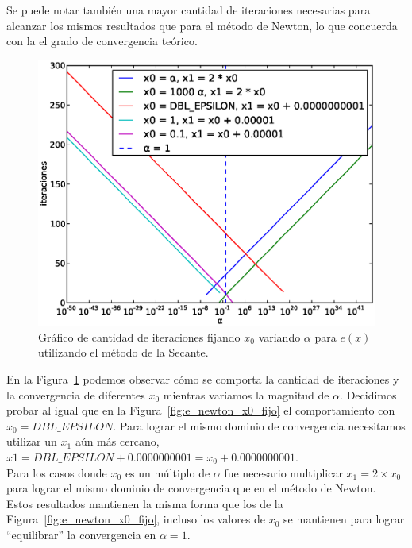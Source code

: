 Se puede notar también una mayor cantidad de iteraciones necesarias para
alcanzar los mismos resultados que para el método de Newton, lo que concuerda
con la el grado de convergencia teórico.

\begin{figure}[!htbp]
  \begin{center}
    \includegraphics[scale=0.5]{graficos/new/e_secante_x0_fijo.eps}
    \caption{\label{fig:e_secante_x0_fijo} Gráfico de cantidad de iteraciones fijando $x_0$ variando $\alpha$ para $e(x)$ utilizando el método de la Secante.}
  \end{center}
\end{figure}

En la Figura~\ref{fig:e_secante_x0_fijo} podemos observar cómo se comporta la
cantidad de iteraciones y la convergencia de diferentes $x_0$ mientras variamos
la magnitud de $\alpha$. Decidimos probar al igual que en la
Figura~\ref{fig:e_newton_x0_fijo} el comportamiento con $x_0 =
\textit{DBL\_EPSILON}$. Para lograr el mismo dominio de convergencia
necesitamos utilizar un $x_1$ aún más cercano,  $x1 = \textit{DBL\_EPSILON} +
0.0000000001 = x_0 + 0.0000000001$.\\

Para los casos donde $x_0$ es un múltiplo de $\alpha$ fue necesario multiplicar
$x_1 = 2 \times x_0$ para lograr el mismo dominio de convergencia que en el método
de Newton.\\

Estos resultados mantienen la misma forma que los de la
Figura~\ref{fig:e_newton_x0_fijo}, incluso los valores de $x_0$ se mantienen
para lograr ``equilibrar'' la convergencia en $\alpha = 1$.\\

